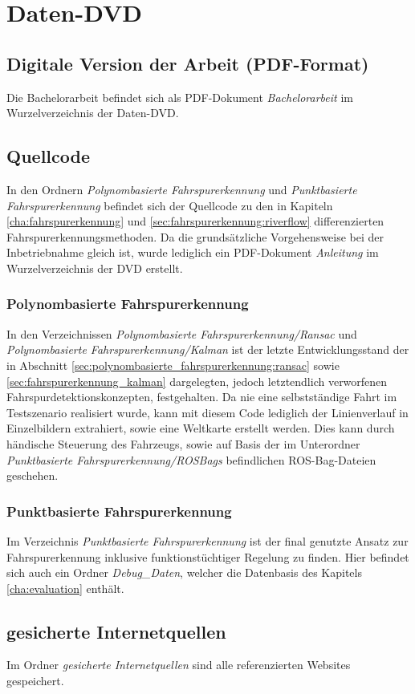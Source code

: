 \appendix
{} %
\newcommand{\fdname}[1]{\emph{#1}}
\chapter{Daten-DVD}	
\section{Digitale Version der Arbeit (PDF-Format)}
Die Bachelorarbeit befindet sich als PDF-Dokument \fdname{Bachelorarbeit} im Wurzelverzeichnis der Daten-DVD.

\section{Quellcode}
In den Ordnern \fdname{Polynombasierte Fahrspurerkennung} und \fdname{Punktbasierte Fahrspurerkennung} befindet sich der Quellcode zu den in Kapiteln \ref{cha:fahrspurerkennung} und \ref{sec:fahrspurerkennung:riverflow} differenzierten Fahrspurerkennungsmethoden. Da die grundsätzliche Vorgehensweise bei der Inbetriebnahme gleich ist, wurde lediglich ein PDF-Dokument \fdname{Anleitung} im Wurzelverzeichnis der DVD erstellt.

\subsection{Polynombasierte Fahrspurerkennung}
In den Verzeichnissen \fdname{Polynombasierte Fahrspurerkennung/Ransac} und \fdname{Polynombasierte Fahrspurerkennung/Kalman} ist der letzte Entwicklungsstand der in Abschnitt \ref{sec:polynombasierte_fahrspurerkennung:ransac} sowie \ref{sec:fahrspurerkennung_kalman} dargelegten, jedoch letztendlich verworfenen Fahrspurdetektionskonzepten, festgehalten. Da nie eine selbstständige Fahrt im Testszenario realisiert wurde, kann mit diesem Code lediglich der Linienverlauf in Einzelbildern extrahiert, sowie eine Weltkarte erstellt werden. Dies kann durch händische Steuerung des Fahrzeugs, sowie auf Basis der im Unterordner \fdname{Punktbasierte Fahrspurerkennung/ROSBags} befindlichen
ROS-Bag-Dateien geschehen.

\subsection{Punktbasierte Fahrspurerkennung}
\label{anhang:quellcode:punktbasierte}
Im Verzeichnis \fdname{Punktbasierte Fahrspurerkennung} ist der final genutzte Ansatz zur Fahrspurerkennung inklusive funktionstüchtiger Regelung zu finden. Hier befindet sich auch ein Ordner \fdname{Debug\_Daten}, welcher die Datenbasis des Kapitels \ref{cha:evaluation} enthält.

\section{gesicherte Internetquellen}
Im Ordner \fdname{gesicherte Internetquellen} sind alle referenzierten Websites gespeichert.
